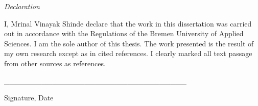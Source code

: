 

\newpage
\thispagestyle{empty}
\begin{center}
\Huge\emph{Declaration}
\end{center}
\medskip
\noindent

I, Mrinal Vinayak Shinde declare that the work in this dissertation was carried out in accordance with the Regulations of the Bremen University of Applied Sciences. I am the sole author of this thesis. The work presented is the result of my own research except as in cited references. I clearly marked all text passage from other sources as references. 

\vspace{1.2cm}

\_\_\_\_\_\_\_\_\_\_\_\_\_\_\_\_\_\_\_\_\_\_\_\_\_\_\_\_\_\_\_\_\_\_\break

Signature, Date

\vspace*{\fill}